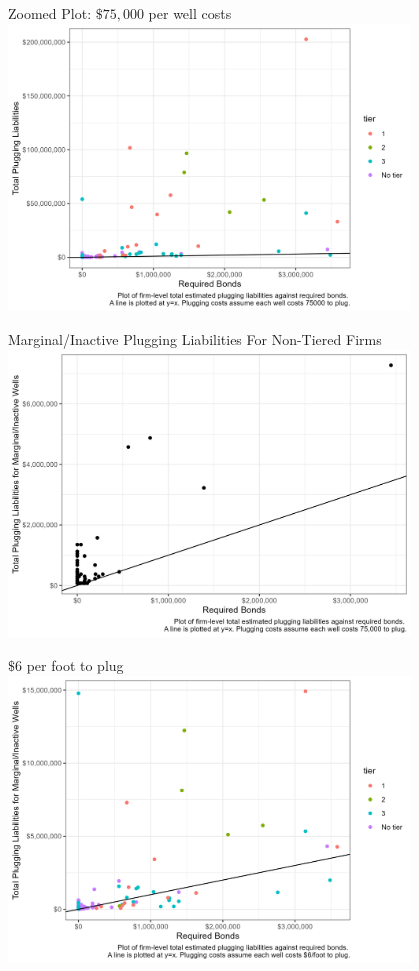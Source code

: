 \documentclass{beamer}
\begin{document}
\begin{frame}{Zoomed Plot: $\$75,000$ per well costs}
\label{Liability2Zoom}
\includegraphics[width=0.8\textwidth]{Figures/BondsLiabilities2_zoomed.jpg}\\
\hyperlink{Fig2}{}
\end{frame}

\begin{frame}{Marginal/Inactive Plugging Liabilities For Non-Tiered Firms}
\label{Tier4Liability2}
\vspace{-0.3cm}
    \includegraphics[width=0.8\textwidth]{Figures/InactiveMarginalLiabilities2_Tier4SmallFirms.jpg}

    \hyperlink{Fig2Marginal}{}
\end{frame}

\begin{frame}{$\$6$ per foot to plug}
\label{MarginalInactiveLiability3}
    \includegraphics[width=0.8\textwidth]{Figures/InactiveMarginalLiabilities3.jpg}
\end{frame}
\end{document}
